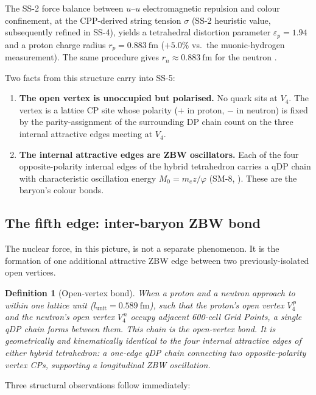 \documentclass[11pt,letterpaper]{article}
\newtheorem{definition}[theorem]{Definition}
\newcommand{\phig}{\varphi}
\newcommand{\Mzero}{M_0}
\newcommand{\lunit}{l_{\mathrm{unit}}}
\newcommand{\rp}{r_{p}}
\newcommand{\rn}{r_{n}}
\begin{document}
The SS-2 force balance between $u$--$u$ electromagnetic repulsion and colour confinement, at the CPP-derived string tension $\sigma$ (SS-2 heuristic value, subsequently refined in SS-4), yields a tetrahedral distortion parameter $\varepsilon_p = 1.94$ and a proton charge radius $\rp = 0.883~\mathrm{fm}$ ($+5.0\%$ vs.\ the muonic-hydrogen measurement). The same procedure gives $\rn \approx 0.883~\mathrm{fm}$ for the neutron \citep{abshier2026ss2}.

Two facts from this structure carry into SS-5:

\begin{enumerate}
\item \textbf{The open vertex is unoccupied but polarised.} No quark sits at $V_4$. The vertex is a lattice CP site whose polarity ($+$ in proton, $-$ in neutron) is fixed by the parity-assignment of the surrounding DP chain count on the three internal attractive edges meeting at $V_4$.
\item \textbf{The internal attractive edges are ZBW oscillators.} Each of the four opposite-polarity internal edges of the hybrid tetrahedron carries a qDP chain with characteristic oscillation energy $\Mzero = m_e z/\phig$ (SM-8, \citet{abshier2026sm8}). These are the baryon's colour bonds.
\end{enumerate}

\subsection{The fifth edge: inter-baryon ZBW bond}

The nuclear force, in this picture, is not a separate phenomenon. It is the formation of one additional attractive ZBW edge between two previously-isolated open vertices.

\begin{definition}[Open-vertex bond]
\label{def:bond}
When a proton and a neutron approach to within one lattice unit ($\lunit = 0.589~\mathrm{fm}$), such that the proton's open vertex $V_4^{\,p}$ and the neutron's open vertex $V_4^{\,n}$ occupy adjacent 600-cell Grid Points, a single qDP chain forms between them. This chain is the \emph{open-vertex bond}. It is geometrically and kinematically identical to the four internal attractive edges of either hybrid tetrahedron: a one-edge qDP chain connecting two opposite-polarity vertex CPs, supporting a longitudinal ZBW oscillation.
\end{definition}

Three structural observations follow immediately:
\end{document}
